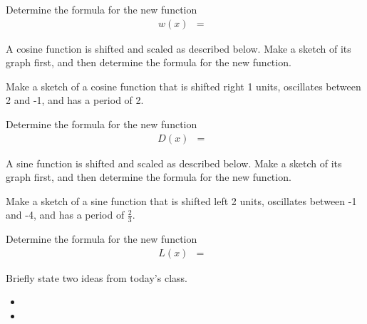 \begin{problem}
\begin{subproblem}
    \vspace{-0.5em}
    \hspace{-7em}\scalebox{0.72}{}

    \item Determine the formula for the new function
      \begin{eqnarray*}
        w(x) & = & 
      \end{eqnarray*}
  \end{subproblem}

\clearpage

\item A cosine function is shifted and scaled as described
  below. Make a sketch of its graph first, and then determine the
  formula for the new function.
  \begin{subproblem}
  \item Make a sketch of a cosine function that is shifted right
    1 units, oscillates between 2 and -1, and has a period of 2.

    \vspace{-0.5em}
    \hspace{-7em}\scalebox{0.72}{}

    \item Determine the formula for the new function
      \begin{eqnarray*}
        D(x) & = & 
      \end{eqnarray*}
  \end{subproblem}

\item A sine function is shifted and scaled as described
  below. Make a sketch of its graph first, and then determine the
  formula for the new function.
  \begin{subproblem}
  \item Make a sketch of a sine function that is shifted left
    2 units, oscillates between -1 and -4, and has a period of
    $\frac{2}{3}$.

    \vspace{-0.5em}
    \hspace{-7em}\scalebox{0.72}{}

    \item Determine the formula for the new function
      \begin{eqnarray*}
        L(x) & = & 
      \end{eqnarray*}
  \end{subproblem}


\end{problem}

\postClass

\begin{problem}
\item Briefly state two ideas from today's class.
  \begin{itemize}
  \item 
  \item 
  \end{itemize}
\item 
  \begin{subproblem}
    \item
  \end{subproblem}
\end{problem}



